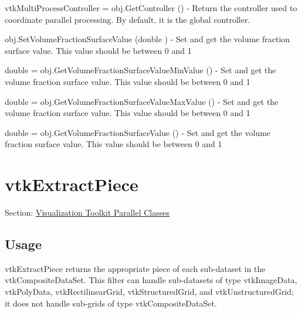 \begin{DoxyItemize}
\item {\ttfamily vtk\-Multi\-Process\-Controller = obj.\-Get\-Controller ()} -\/ Return the controller used to coordinate parallel processing. By default, it is the global controller.  
\item {\ttfamily obj.\-Set\-Volume\-Fraction\-Surface\-Value (double )} -\/ Set and get the volume fraction surface value. This value should be between 0 and 1  
\item {\ttfamily double = obj.\-Get\-Volume\-Fraction\-Surface\-Value\-Min\-Value ()} -\/ Set and get the volume fraction surface value. This value should be between 0 and 1  
\item {\ttfamily double = obj.\-Get\-Volume\-Fraction\-Surface\-Value\-Max\-Value ()} -\/ Set and get the volume fraction surface value. This value should be between 0 and 1  
\item {\ttfamily double = obj.\-Get\-Volume\-Fraction\-Surface\-Value ()} -\/ Set and get the volume fraction surface value. This value should be between 0 and 1  
\end{DoxyItemize}\hypertarget{vtkparallel_vtkextractpiece}{}\section{vtk\-Extract\-Piece}\label{vtkparallel_vtkextractpiece}
Section\-: \hyperlink{sec_vtkparallel}{Visualization Toolkit Parallel Classes} \hypertarget{vtkwidgets_vtkxyplotwidget_Usage}{}\subsection{Usage}\label{vtkwidgets_vtkxyplotwidget_Usage}
vtk\-Extract\-Piece returns the appropriate piece of each sub-\/dataset in the vtk\-Composite\-Data\-Set. This filter can handle sub-\/datasets of type vtk\-Image\-Data, vtk\-Poly\-Data, vtk\-Rectilinear\-Grid, vtk\-Structured\-Grid, and vtk\-Unstructured\-Grid; it does not handle sub-\/grids of type vtk\-Composite\-Data\-Set.


